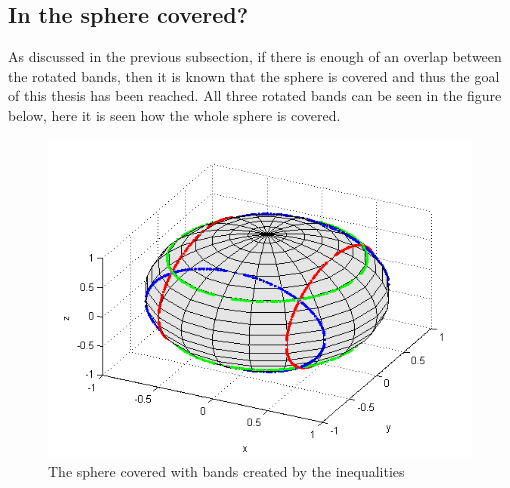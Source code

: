 \subsection{In the sphere covered?}\label{Is the sphere covered?}
As discussed in the previous subsection, if there is enough of an overlap between the rotated bands, then it is known that the sphere is covered and thus the goal of this thesis has been reached.
All three rotated bands can be seen in the figure below, here it is seen how the whole sphere is covered.
\begin{figure}[H]
\begin{center}
\includegraphics[scale=0.9]{coveredsphere.png}
\caption{The sphere covered with bands created by the inequalities}
\label{fig:coveredsphere}
\end{center}
\end{figure}